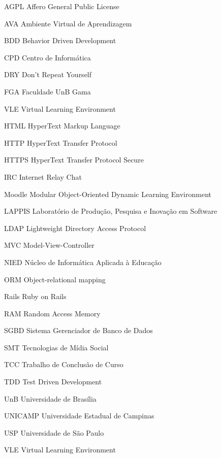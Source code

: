\begin{siglas}
  \item[AGPL] Affero General Public License
  \item[AVA] Ambiente Virtual de Aprendizagem
  \item[BDD] Behavior Driven Development
  \item[CPD] Centro de Informática
  \item[DRY] Don’t Repeat Yourself
  \item[FGA] Faculdade UnB Gama
  \item[VLE] Virtual Learning Environment
  \item[HTML] HyperText Markup Language
  \item[HTTP] HyperText Transfer Protocol
  \item[HTTPS] HyperText Transfer Protocol Secure
  \item[IRC] Internet Relay Chat
  \item[Moodle] Modular Object-Oriented Dynamic Learning Environment
  \item[LAPPIS] Laboratório de Produção, Pesquisa e Inovação em Software
  \item[LDAP] Lightweight Directory Access Protocol
  \item[MVC] Model-View-Controller
  \item[NIED] Núcleo de Informática Aplicada à Educação
  \item[ORM] Object-relational mapping
  \item[Rails] Ruby on Rails
  \item[RAM] Random Access Memory
  \item[SGBD] Sistema Gerenciador de Banco de Dados
  \item[SMT] Tecnologias de Mídia Social
  \item[TCC] Trabalho de Conclusão de Curso
  \item[TDD] Test Driven Development
  \item[UnB] Universidade de Brasília
  \item[UNICAMP] Universidade Estadual de Campinas
  \item[USP] Universidade de São Paulo
  \item[VLE] Virtual Learning Environment
\end{siglas}
